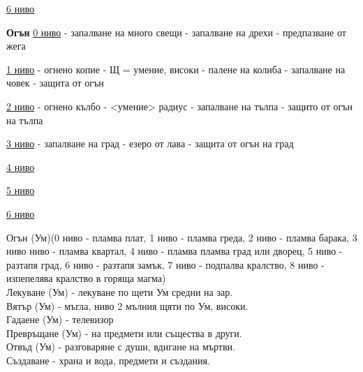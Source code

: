 \underline{6 ниво}



\textbf{Огън}
\underline{0 ниво}
- запалване на много свещи
- запалване на дрехи
- предпазване от жега

\underline{1 ниво}
- огнено копие - Щ = умение, високи
- палене на колиба
- запалване на човек
- защита от огън

\underline{2 ниво}
- огнено кълбо - <умение> радиус
- запалване на тълпа
- защито от огън на тълпа

\underline{3 ниво}
- запалване на град
- езеро от лава
- защита от огън на град

\underline{4 ниво}

\underline{5 ниво}

\underline{6 ниво}



Огън (Ум)(0 ниво - пламва плат, 1 ниво - пламва греда, 2 ниво - пламва барака, 3 ниво ниво - пламва квартал, 4 ниво - пламва пламва град или дворец, 5 ниво - разтапя град, 6 ниво - разтапя замък, 7 ниво - подпалва кралство, 8 ниво - изпепелява кралство в горяща магма) \\
Лекуване (Ум) - лекуване по щети Ум средни на зар.      \\
Вятър (Ум) - мъгла, ниво 2 мълния щяти по Ум, високи.   \\
Гадаене (Ум) - телевизор                                \\
Превръщане (Ум) - на предмети или същества в други.     \\
Отвъд (Ум) - разговаряне с души, вдигане на мъртви.     \\
Създаване - храна и вода, предмети и създания.          \\







